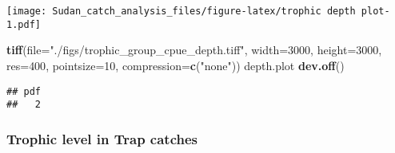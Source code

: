 \documentclass[]{article}
\newenvironment{Shaded}{\begin{snugshade}}{\end{snugshade}}
\newcommand{\KeywordTok}[1]{\textcolor[rgb]{0.13,0.29,0.53}{\textbf{#1}}}
\newcommand{\DataTypeTok}[1]{\textcolor[rgb]{0.13,0.29,0.53}{#1}}
\newcommand{\DecValTok}[1]{\textcolor[rgb]{0.00,0.00,0.81}{#1}}
\newcommand{\StringTok}[1]{\textcolor[rgb]{0.31,0.60,0.02}{#1}}
\newcommand{\NormalTok}[1]{#1}
\begin{document}
\texttt{[image: Sudan\_catch\_analysis\_files/figure-latex/trophic depth plot-1.pdf]}

\begin{Shaded}
\begin{Highlighting}[]
\KeywordTok{tiff}\NormalTok{(}\DataTypeTok{file=}\StringTok{"./figs/trophic_group_cpue_depth.tiff"}\NormalTok{, }\DataTypeTok{width=}\DecValTok{3000}\NormalTok{, }\DataTypeTok{height=}\DecValTok{3000}\NormalTok{, }\DataTypeTok{res=}\DecValTok{400}\NormalTok{, }\DataTypeTok{pointsize=}\DecValTok{10}\NormalTok{, }\DataTypeTok{compression=}\KeywordTok{c}\NormalTok{(}\StringTok{"none"}\NormalTok{))}
\NormalTok{depth.plot}
\KeywordTok{dev.off}\NormalTok{()}
\end{Highlighting}
\end{Shaded}

\begin{verbatim}
## pdf 
##   2
\end{verbatim}

\subsubsection{Trophic level in Trap
catches}\label{trophic-level-in-trap-catches}
\end{document}
